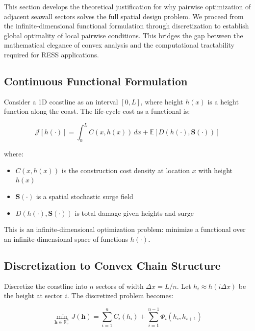 \documentclass[review]{elsarticle}
\begin{document}
This section develops the theoretical justification for why pairwise optimization of adjacent seawall sectors solves the full spatial design problem. We proceed from the infinite-dimensional functional formulation through discretization to establish global optimality of local pairwise conditions. This bridges the gap between the mathematical elegance of convex analysis and the computational tractability required for RESS applications.

\subsection{Continuous Functional Formulation}

Consider a 1D coastline as an interval $[0, L]$, where height $h(x)$ is a height function along the coast. The life-cycle cost as a functional is:

\begin{equation}
\mathcal{J}[h(\cdot)] = \int_0^L C(x, h(x)) \, dx + \mathbb{E}[D(h(\cdot), \mathbf{S}(\cdot))]
\label{eq:functional_lcc}
\end{equation}

where:
\begin{itemize}
\item $C(x, h(x))$ is the construction cost density at location $x$ with height $h(x)$
\item $\mathbf{S}(\cdot)$ is a spatial stochastic surge field
\item $D(h(\cdot), \mathbf{S}(\cdot))$ is total damage given heights and surge
\end{itemize}

This is an infinite-dimensional optimization problem: minimize a functional over an infinite-dimensional space of functions $h(\cdot)$.

\subsection{Discretization to Convex Chain Structure}

Discretize the coastline into $n$ sectors of width $\Delta x = L/n$. Let $h_i \approx h(i \Delta x)$ be the height at sector $i$. The discretized problem becomes:

\begin{equation}
\min_{\mathbf{h} \in \mathbb{R}_+^n} J(\mathbf{h}) = \sum_{i=1}^n C_i(h_i) + \sum_{i=1}^{n-1} \Phi_i(h_i, h_{i+1})
\label{eq:discretized_lcc}
\end{equation}
\end{document}

